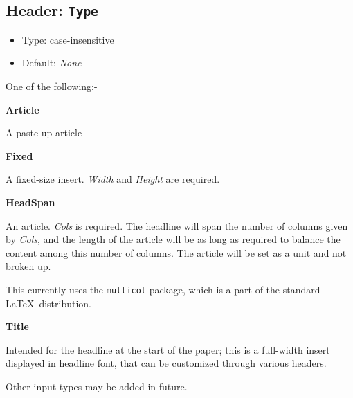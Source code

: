\documentclass[a4paper,DIV=11]{scrartcl}
\newcommand{\deft}[2]{\nopagebreak\noindent\hspace{0.5in}\textbf{#1}\par\noindent{}#2\pagebreak[1]\par}
\newcommand{\property}[5]{
  \subsection{#1: \texttt{#2}}
  \begin{itemize}
  \item Type: #3
  \item Default: #4
  \end{itemize}
  #5
}
\newcommand{\header}{\property{Header}}
\begin{document}
\begin{multicols}{2}
\header{Type}{case-insensitive}{\textit{None}}{
  One of the following:-\par
  \deft{Article}{A paste-up article}
  \deft{Fixed}{A fixed-size insert. \textit{Width} and \textit{Height} are required.}
  \deft{HeadSpan}{An article. \textit{Cols} is required. The headline will
    span the number of columns given by \textit{Cols}, and the length
    of the article will be as long as required to balance the content
    among this number of columns. The article will be set as a unit
    and not broken up.\par This currently uses the
    \texttt{multicol} package, which is a part of the standard
    \LaTeX\ distribution.}
  \deft{Title}{Intended for the headline at the start of the paper;
    this is a full-width insert displayed in headline font, that can
    be customized through various headers.}
  Other input types may be added in future.

}
\end{multicols}
\end{document}
